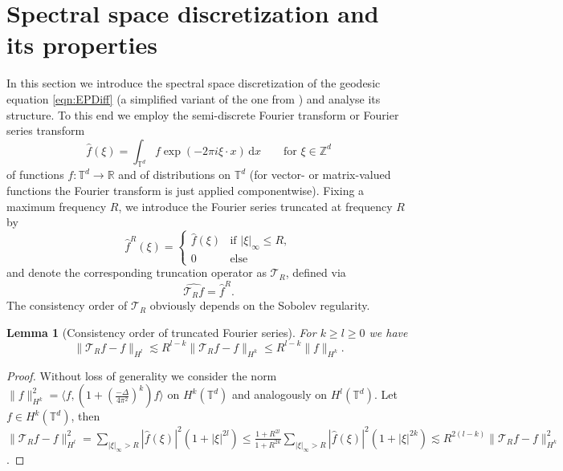 \documentclass[a4paper, 12pt]{article}
\newtheorem{lemma}[theorem]{Lemma}
\newcommand{\R}{\mathbb{R}}
\newcommand{\T}{\mathbb{T}}
\newcommand{\Z}{\mathbb{Z}}
\renewcommand{\d}{\mathrm{d}}
\newcommand{\trunc}[1][R]{\mathcal{T}_{#1}}
\newcommand{\truncFourier}[2]{\widehat{#1}^{#2}}
\begin{document}
\section{Spectral space discretization and its properties}\label{sec:discretization}
In this section we introduce the spectral space discretization of the geodesic equation \eqref{eqn:EPDiff} (a simplified variant of the one from \cite{ZhFl19}) and analyse its structure.
To this end we employ the semi-discrete Fourier transform or Fourier series transform
\begin{equation*}
\hat f(\xi)=\int_{\T^d} f\exp(-2\pi i\xi\cdot x)\,\d x\qquad\text{for }\xi\in\Z^d
\end{equation*}
of functions $f:\T^d\to\R$ and of distributions on $\T^d$ (for vector- or matrix-valued functions the Fourier transform is just applied componentwise).
Fixing a maximum frequency $R$, we introduce the Fourier series truncated at frequency $R$ by
\begin{equation*}
\truncFourier{f}{R}(\xi)=\begin{cases}\hat f(\xi)&\text{if }|\xi|_\infty\leq R,\\0&\text{else}\end{cases}
\end{equation*}
and denote the corresponding truncation operator as $\trunc$, defined via
\begin{equation*}
\widehat{\trunc f}=\truncFourier fR.
\end{equation*}
The consistency order of $\trunc$ obviously depends on the Sobolev regularity.

\begin{lemma}[Consistency order of truncated Fourier series]\label{thm:consistencyTruncatedFourier}
For $k\geq l\geq0$ we have
\begin{equation*}
\|\trunc f-f\|_{H^l}\lesssim R^{l-k}\|\trunc f-f\|_{H^k}\leq R^{l-k}\|f\|_{H^k}.
\end{equation*}
\end{lemma}
\begin{proof}
Without loss of generality we consider the norm $\|f\|_{H^k}^2=\langle f,(1+(\frac{-\Delta}{4\pi^2})^k)f\rangle$ on $H^k(\T^d)$ and analogously on $H^l(\T^d)$.
Let $f\in H^k(\T^d)$, then
$\|\trunc f-f\|_{H^l}^2
=\sum_{|\xi|_\infty>R}|\hat f(\xi)|^2(1+|\xi|^{2l})
\leq\frac{1+R^{2l}}{1+R^{2k}}\sum_{|\xi|_\infty>R}|\hat f(\xi)|^2(1+|\xi|^{2k})
\lesssim R^{2(l-k)}\|\trunc f-f\|_{H^k}^2$.
\end{proof}
\end{document}

